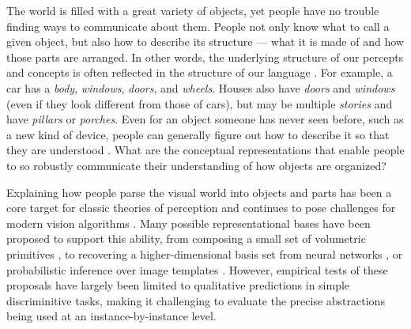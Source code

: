 \documentclass[10pt,letterpaper]{article}
\begin{document}

The world is filled with a great variety of objects, yet people have no trouble finding ways to communicate about them. 
People not only know what to call a given object, but also how to describe its structure --- what it is made of and how those parts are arranged.
In other words, the underlying structure of our percepts and concepts is often reflected in the structure of our language \cite{miller2013language,landau1993and}.
For example, a car has a \emph{body}, \emph{windows}, \emph{doors}, and \emph{wheels}.
Houses also have \emph{doors} and \emph{windows} (even if they look different from those of cars), but may be multiple \emph{stories} and have \emph{pillars} or \emph{porches}.
Even for an object someone has never seen before, such as a new kind of device, people can generally figure out how to describe it so that they are understood \cite{hawkins2020characterizing}. 
What are the conceptual representations that enable people to so robustly communicate their understanding of how objects are organized?

Explaining how people parse the visual world into objects and parts has been a core target for classic theories of perception
 and continues to pose challenges for modern vision algorithms .
Many possible representational bases have been proposed to support this ability, from composing a small set of volumetric primitives , to recovering a higher-dimensional basis set from neural networks , or probabilistic inference over image templates .
However, empirical tests of these proposals have largely been limited to qualitative predictions in simple discriminitive tasks, making it challenging to evaluate the precise abstractions being used at an instance-by-instance level. 
\end{document}
